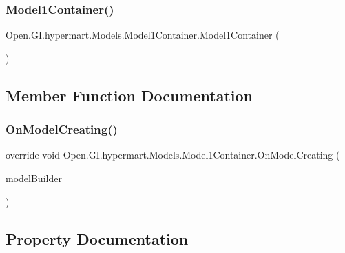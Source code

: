 \subsubsection{\texorpdfstring{Model1\+Container()}{Model1Container()}}
{\footnotesize\ttfamily Open.\+G\+I.\+hypermart.\+Models.\+Model1\+Container.\+Model1\+Container (\begin{DoxyParamCaption}{ }\end{DoxyParamCaption})}



\subsection{Member Function Documentation}
\hypertarget{class_open_1_1_g_i_1_1hypermart_1_1_models_1_1_model1_container_a738eaf983c5fc89665bff3d90f9fb188}{}\label{class_open_1_1_g_i_1_1hypermart_1_1_models_1_1_model1_container_a738eaf983c5fc89665bff3d90f9fb188} 
\subsubsection{\texorpdfstring{On\+Model\+Creating()}{OnModelCreating()}}
{\footnotesize\ttfamily override void Open.\+G\+I.\+hypermart.\+Models.\+Model1\+Container.\+On\+Model\+Creating (\begin{DoxyParamCaption}\item[{Db\+Model\+Builder}]{model\+Builder }\end{DoxyParamCaption})\hspace{0.3cm}{\ttfamily [protected]}}



\subsection{Property Documentation}
\hypertarget{class_open_1_1_g_i_1_1hypermart_1_1_models_1_1_model1_container_ad8999f3ba131f3c46c9162b2eff4c7f9}{}\label{class_open_1_1_g_i_1_1hypermart_1_1_models_1_1_model1_container_ad8999f3ba131f3c46c9162b2eff4c7f9} 
